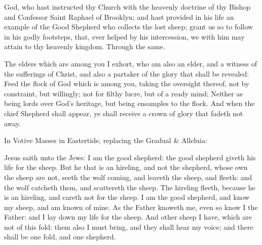 \collect
{} God, who hast instructed thy Church with the heavenly doctrine of thy Bishop and Confessor Saint Raphael of Brooklyn; and hast provided in his life an example of the Good Shepherd who collects the lost sheep; grant us so to follow in his godly footsteps, that, ever helped by his intercession, we with him may attain to thy heavenly kingdom. Through the same.

 The elders which are among you I exhort, who am also an elder, and a witness of the sufferings of Christ, and also a partaker of the glory that shall be revealed: Feed the flock of God which is among you, taking the oversight thereof, not by constraint, but willingly; not for filthy lucre, but of a ready mind; Neither as being lords over God's heritage, but being ensamples to the flock. And when the chief Shepherd shall appear, ye shall receive a crown of glory that fadeth not away.


\tractnotice
{}

\clearpage
\begin{rubric}
	In Votive Masses in Eastertide, replacing the Gradual \& Alleluia:
\end{rubric}

 Jesus saith unto the Jews: I am the good shepherd: the good shepherd giveth his life for the sheep. But he that is an hireling, and not the shepherd, whose own the sheep are not, seeth the wolf coming, and leaveth the sheep, and fleeth: and the wolf catcheth them, and scattereth the sheep. The hireling fleeth, because he is an hireling, and careth not for the sheep. I am the good shepherd, and know my sheep, and am known of mine. As the Father knoweth me, even so know I the Father: and I lay down my life for the sheep. And other sheep I have, which are not of this fold: them also I must bring, and they shall hear my voice; and there shall be one fold, and one shepherd.

